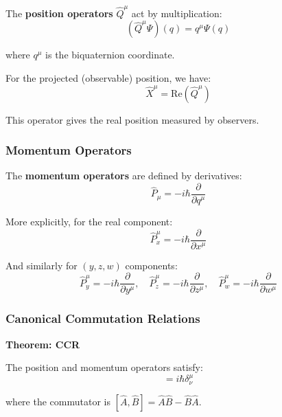 The \textbf{position operators} $\hat{Q}^{\mu}$ act by multiplication:
\begin{equation}
(\hat{Q}^{\mu} \Psi)(q) = q^{\mu} \Psi(q)
\end{equation}

where $q^{\mu}$ is the biquaternion coordinate.

For the projected (observable) position, we have:
\begin{equation}
\hat{X}^{\mu} = \text{Re}(\hat{Q}^{\mu})
\end{equation}

This operator gives the real position measured by observers.

\subsubsection{Momentum Operators}

The \textbf{momentum operators} are defined by derivatives:
\begin{equation}
\hat{P}_{\mu} = -i\hbar \frac{\partial}{\partial q^{\mu}}
\end{equation}

More explicitly, for the real component:
\begin{equation}
\hat{P}_x^{\mu} = -i\hbar \frac{\partial}{\partial x^{\mu}}
\end{equation}

And similarly for $(y, z, w)$ components:
\begin{equation}
\hat{P}_y^{\mu} = -i\hbar \frac{\partial}{\partial y^{\mu}}, \quad
\hat{P}_z^{\mu} = -i\hbar \frac{\partial}{\partial z^{\mu}}, \quad
\hat{P}_w^{\mu} = -i\hbar \frac{\partial}{\partial w^{\mu}}
\end{equation}

\subsubsection{Canonical Commutation Relations}

\textbf{Theorem: CCR}

The position and momentum operators satisfy:
\begin{equation}
[\hat{Q}^{\mu}, \hat{P}_{\nu}] = i\hbar \delta^{\mu}_{\nu}
\label{eq:CCR}
\end{equation}

where the commutator is $[\hat{A}, \hat{B}] = \hat{A}\hat{B} - \hat{B}\hat{A}$.

